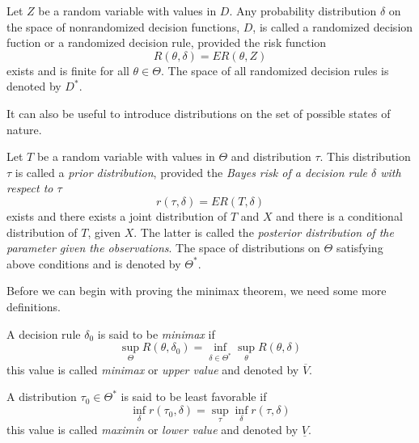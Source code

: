 \begin{definition}
	Let $Z$ be a random variable with values in $D$. Any probability distribution $\delta$ on the space of nonrandomized decision functions, $D$, is called a randomized decision fuction or a randomized decision rule, provided the risk function
	\[
	R(\theta,\delta)=ER(\theta,Z)
	\]
	exists and is finite for all $\theta\in \Theta$. The space of all randomized decision rules is denoted by $D^\ast$.%
\end{definition}

It can also be useful to introduce distributions on the set of possible states of nature.
\begin{definition}
	Let $T$ be a random variable with values in $\Theta$ and distribution $\tau$.
	This distribution $\tau$ is called a \emph{prior distribution}, provided the \emph{Bayes risk of a decision rule $\delta$ with respect to $\tau$}
	\[
	r(\tau,\delta)=ER(T,\delta)
	\]
	exists and there exists a joint distribution of $T$ and $X$ and there is a conditional distribution of $T$, given $X$. The latter is called the \emph{posterior distribution of the parameter given the observations}. The space of distributions on $\Theta$ satisfying above conditions and is denoted by $\Theta^\ast$.
\end{definition}


Before we can begin with proving the minimax theorem, we need some more definitions.

\begin{definition}
	A decision rule $\delta_0$ is said to be \emph{minimax} if\[
	\sup_\Theta R(\theta,\delta_0)=\inf_{\delta\in \Theta^\ast}\sup_\theta R(\theta,\delta)
	\]
	this value is called \emph{minimax} or \emph{upper value} and denoted by $\overline{V}$.
\end{definition}

\begin{definition}
A distribution $\tau_0\in \Theta^\ast$ is said to be least favorable if 
\[
\inf_\delta r(\tau_0,\delta)=\sup_\tau\inf_\delta r(\tau,\delta)
\]
this value is called \emph{maximin} or \emph{lower value} and denoted by $\underline{V}$.
\end{definition}

